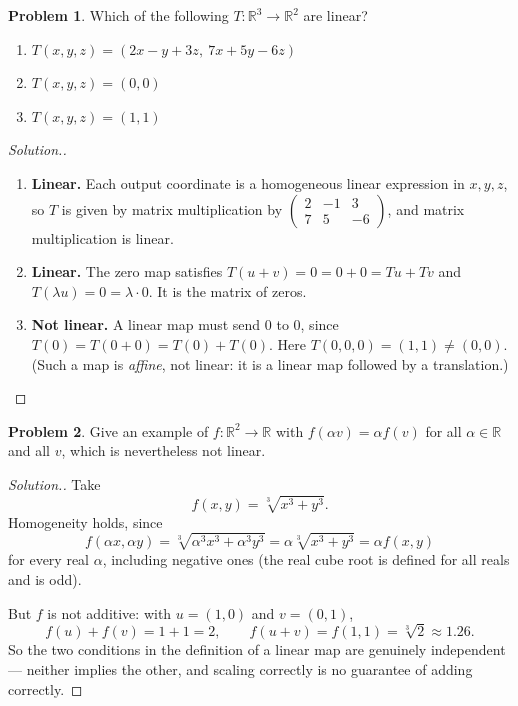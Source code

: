 \documentclass[11pt,a4paper]{article}
\theoremstyle{definition}
\newtheorem{problemx}{Problem}[section]
\newenvironment{problem}{\begin{problemx}}{\end{problemx}}
\newenvironment{solution}
  {\renewcommand{\qedsymbol}{}\begin{proof}[\textit{Solution}.]}
  {\end{proof}}
\begin{document}
\begin{problem}
Which of the following $T:\mathbb{R}^3\rightarrow\mathbb{R}^2$ are linear?
\begin{enumerate}
\item[(a)] $T(x,y,z)=(2x-y+3z,\ 7x+5y-6z)$ \qquad
\item[(b)] $T(x,y,z)=(0,0)$ \qquad
\item[(c)] $T(x,y,z)=(1,1)$
\end{enumerate}
\end{problem}
\begin{solution}
\begin{enumerate}
\item[(a)] \textbf{Linear.} Each output coordinate is a homogeneous linear
expression in $x,y,z$, so $T$ is given by matrix multiplication by
$\begin{pmatrix}2&-1&3\\7&5&-6\end{pmatrix}$, and matrix multiplication is
linear.

\item[(b)] \textbf{Linear.} The zero map satisfies
$T(u+v)=0=0+0=Tu+Tv$ and $T(\lambda u)=0=\lambda\cdot 0$. It is the matrix of
zeros.

\item[(c)] \textbf{Not linear.} A linear map must send $0$ to $0$, since
$T(0)=T(0+0)=T(0)+T(0)$. Here $T(0,0,0)=(1,1)\neq(0,0)$. (Such a map is
\emph{affine}, not linear: it is a linear map followed by a translation.)
\end{enumerate}
\end{solution}

\begin{problem}
Give an example of $f:\mathbb{R}^2\rightarrow\mathbb{R}$ with
$f(\alpha v)=\alpha f(v)$ for all $\alpha\in\mathbb{R}$ and all $v$, which is
nevertheless not linear.
\end{problem}
\begin{solution}
Take
$$f(x,y)=\sqrt[3]{x^3+y^3}.$$
Homogeneity holds, since
$$f(\alpha x,\alpha y)=\sqrt[3]{\alpha^3x^3+\alpha^3y^3}
=\alpha\sqrt[3]{x^3+y^3}=\alpha f(x,y)$$
for every real $\alpha$, including negative ones (the real cube root is
defined for all reals and is odd).

But $f$ is not additive: with $u=(1,0)$ and $v=(0,1)$,
$$f(u)+f(v)=1+1=2,\qquad f(u+v)=f(1,1)=\sqrt[3]{2}\approx 1.26.$$
So the two conditions in the definition of a linear map are genuinely
independent --- neither implies the other, and scaling correctly is no
guarantee of adding correctly.
\end{solution}
\end{document}
